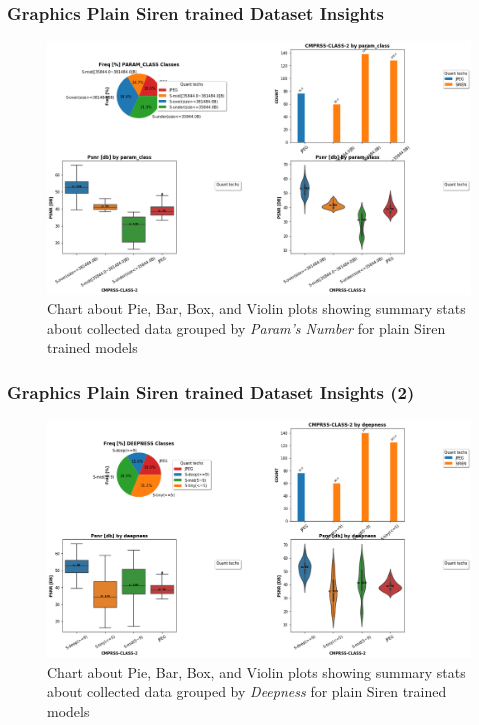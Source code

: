 



\begin{frame}
\frametitle{Graphics Plain Siren trained Dataset Insights}

\begin{figure}
\includegraphics[scale=0.3]{slides/experiments/plain_siren_dataset/baseline_bpp_vs_psnr_pbbv_param_class.png}
\caption{Chart about Pie, Bar, Box, and Violin plots showing summary stats about collected data grouped by \textit{Param's Number} for plain Siren trained models}
\end{figure}

\end{frame}


\begin{frame}
\frametitle{Graphics Plain Siren trained Dataset Insights (2)}

\begin{figure}
\includegraphics[scale=0.3]{slides/experiments/plain_siren_dataset/baseline_bpp_vs_psnr_pbbv_deepness.png}
\caption{Chart about Pie, Bar, Box, and Violin plots showing summary stats about collected data  grouped by \textit{Deepness}  for plain Siren trained models}
\end{figure}

\end{frame}
